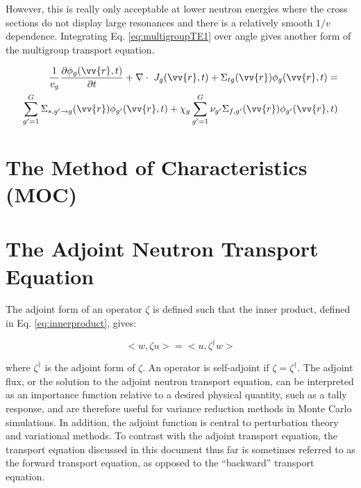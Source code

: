 \documentclass[10pt]{article}
\begin{document}
\begin{flushleft}
However, this is really only acceptable at lower neutron energies where the cross sections do not display large resonances and there is a relatively smooth \(1/v\) dependence. Integrating Eq. \ref{eq:multigroupTE1} over angle gives another form of the multigroup transport equation.

\begin{equation}
\label{eq:multigroupTE2}
\begin{aligned}
\frac{1}{v_g} \frac{\partial\phi_g(\vv{r}, t)}{\partial t} + \nabla\cdot\ J_g(\vv{r}, t) + \Sigma_{tg}(\vv{r})\phi_g(\vv{r}, t) =\\
\sum_{g'=1}^{G} \Sigma_{s, g'\rightarrow g}(\vv{r})\phi_{g'}(\vv{r}, t) + \chi_g \sum_{g'=1}^{G} \nu_{g'}\Sigma_{f,g'}(\vv{r})\phi_{g'}(\vv{r}, t)
\end{aligned}
\end{equation}




\clearpage
\section{The Method of Characteristics (MOC)}







\clearpage
\section{The Adjoint Neutron Transport Equation}

The adjoint form of an operator \(\zeta\) is defined such that the inner product, defined in Eq. \ref{eq:innerproduct}, gives:

\begin{equation}
\label{eq:AdjointDefinition}
<w, \zeta u> = <u, \zeta^\dagger w>
\end{equation}

where \(\zeta^\dagger\) is the adjoint form of \(\zeta\). An operator is self-adjoint if \(\zeta=\zeta^\dagger\). The adjoint flux, or the solution to the adjoint neutron transport equation, can be interpreted as an importance function relative to a desired physical quantity, such as a tally response, and are therefore useful for variance reduction methods in Monte Carlo simulations. In addition, the adjoint function is central to perturbation theory and variational methods. To contrast with the adjoint transport equation, the transport equation discussed in this document thus far is sometimes referred to as the forward transport equation, as opposed to the ``backward'' transport equation. 


\end{flushleft}
\end{document}
